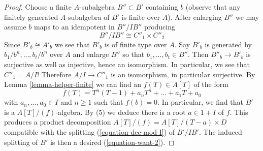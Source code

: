 \begin{proof}
\medskip\noindent
Choose a finite $A$-subalgebra $B'' \subset B'$ containing $b$
(observe that any finitely generated $A$-subalgebra of $B'$
is finite over $A$). After enlarging $B''$ we may assume
$b$ maps to an idempotent in $B''/IB''$ producing
\begin{equation}
\label{equation-again-dec-mod-I}
B''/IB'' \cong C''_1 \times C''_2
\end{equation}
Since $B'_b \cong A'_b$ we see that $B'_b$ is of finite type over $A$.
Say $B'_b$ is generated by $b_1/b^n, \ldots, b_t/b^n$ over $A$
and enlarge $B''$ so that $b_1, \ldots, b_t \in B''$. Then
$B''_b \to B'_b$ is surjective as well as injective, hence an isomorphism.
In particular, we see that $C''_1 = A/I$! Therefore $A/I \to C''_1$
is an isomorphism, in particular surjective.
By Lemma \ref{lemma-helper-finite} we can find
an $f(T) \in A[T]$ of the form
$$
f(T) = T^n(T - 1) + a_n T^n + \ldots + a_1 T + a_0
$$
with $a_n, \ldots, a_0 \in I$ and $n \ge 1$ such that $f(b) = 0$.
In particular, we find that $B'$ is a $A[T]/(f)$-algebra.
By (5) we deduce there is a root $a \in 1 + I$ of $f$.
This produces a product decomposition $A[T]/(f) = A[T]/(T - a) \times D$
compatible with the splitting (\ref{equation-dec-mod-I}) of $B'/IB'$.
The induced splitting of $B'$ is then a desired (\ref{equation-want-2}).
\end{proof}

